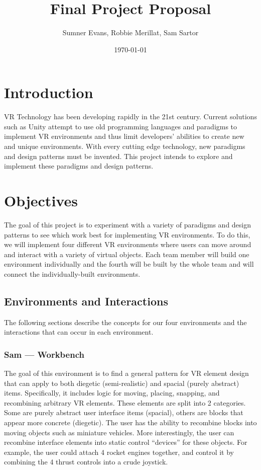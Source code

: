 \documentclass[titlepage,12pt]{article}
\title{Final Project Proposal}
\author{Sumner Evans, Robbie Merillat, Sam Sartor}
\date{\today}
\begin{document}
\maketitle

\section{Introduction}

VR Technology has been developing rapidly in the 21st century. Current solutions
such as Unity attempt to use old programming languages and paradigms to
implement VR environments and thus limit developers' abilities to create new and
unique environments. With every cutting edge technology, new paradigms and
design patterns must be invented. This project intends to explore and implement
these paradigms and design patterns.

\section{Objectives}

The goal of this project is to experiment with a variety of paradigms and design
patterns to see which work best for implementing VR environments. To do this, we
will implement four different VR environments where users can move around and
interact with a variety of virtual objects. Each team member will build one
environment individually and the fourth will be built by the whole team and will
connect the individually-built environments.

\subsection{Environments and Interactions}
The following sections describe the concepts for our four environments and the
interactions that can occur in each environment.


\subsubsection{Sam --- Workbench}
The goal of this environment is to find a general pattern for VR element design
that can apply to both diegetic (semi-realistic) and spacial (purely abstract)
items. Specifically, it includes logic for moving, placing, snapping, and
recombining arbitrary VR elements. These elements are split into 2 categories.
Some are purely abstract user interface items (spacial), others are blocks that
appear more concrete (diegetic). The user has the ability to recombine blocks
into moving objects such as miniature vehicles. More interestingly, the user can
recombine interface elements into static control ``devices'' for these objects.
For example, the user could attach 4 rocket engines together, and control it by
combining the 4 thrust controls into a crude joystick.
\end{document}
